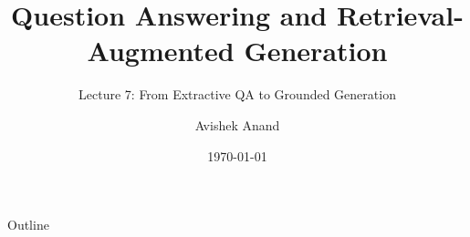 \documentclass[aspectratio=169, xcolor=table]{beamer}
\title[QA and RAG]{Question Answering and Retrieval-Augmented Generation}
\subtitle{Lecture 7: From Extractive QA to Grounded Generation}
\author{Avishek Anand}
\institute{Information Retrieval}
\date{\today}
\begin{document}
\begin{frame}[plain]
\titlepage
\end{frame}

\begin{frame}{Outline}
\tableofcontents
\end{frame}


\end{document}

